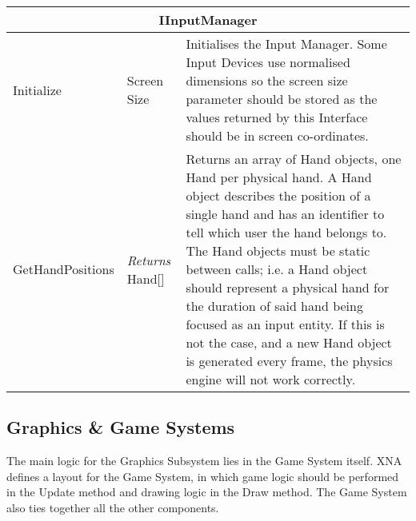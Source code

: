 \begin{table}[H]
\begin{tabular}{|p{3.6cm}|p{3cm}|p{9cm}|}
\hline
\multicolumn{3}{|c|}{IInputManager} \\ \hline
Initialize & Screen Size & 
Initialises the Input Manager. Some Input Devices use normalised dimensions so
the screen size parameter should be stored as the values returned by this 
Interface should be in screen co-ordinates. \\ \hline

GetHandPositions & \emph{Returns} Hand[] &
Returns an array of Hand objects, one Hand per physical hand. A Hand object
describes the position of a single hand and has an identifier to tell which
user the hand belongs to. 
The Hand objects must be static between calls; i.e. a Hand object should
represent a physical hand for the duration of said hand being focused as an
input entity. If this is not the case, and a new Hand object is generated 
every frame, the physics engine will not work correctly. \\ \hline
\end{tabular}
\end{table}

\subsection{Graphics \& Game Systems}
The main logic for the Graphics Subsystem lies in the Game System itself. XNA
defines a layout for the Game System, in which game logic should be performed
in the Update method and drawing logic in the Draw method. The Game System also
ties together all the other components.

